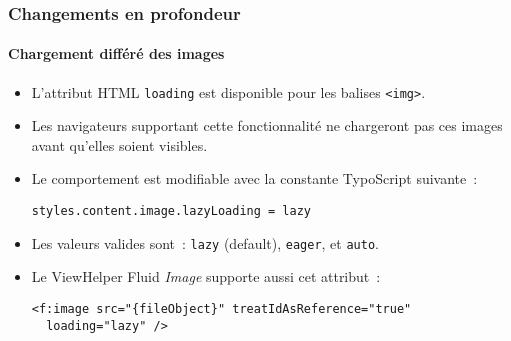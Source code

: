 \begin{frame}[fragile]
	\frametitle{Changements en profondeur}
	\framesubtitle{Chargement différé des images}

	\lstset{basicstyle=\smaller\ttfamily}

	\begin{itemize}
		\item L'attribut HTML \texttt{loading} est disponible pour les balises \texttt{<img>}.
		\item Les navigateurs supportant cette fonctionnalité ne chargeront pas ces images
			avant qu'elles soient visibles.
		\item Le comportement est modifiable avec la constante TypoScript suivante~:

\vspace{-0.4cm}
\begin{lstlisting}
styles.content.image.lazyLoading = lazy
\end{lstlisting}

		\item Les valeurs valides sont~: \texttt{lazy} (default), \texttt{eager}, et \texttt{auto}.
		\item Le ViewHelper Fluid \textit{Image} supporte aussi cet attribut~:
\begin{lstlisting}
<f:image src="{fileObject}" treatIdAsReference="true"
  loading="lazy" />
\end{lstlisting}

	\end{itemize}

\end{frame}


